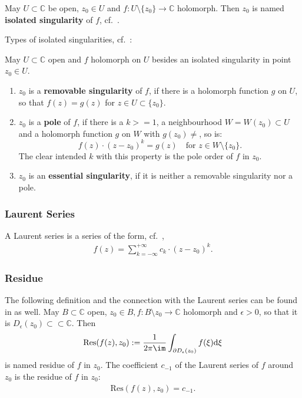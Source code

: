 May $U \subset \mathbb{C}$ be open, $z_0 \in U$ and $f : U \setminus \{z_0\} \rightarrow \mathbb{C}$ holomorph. Then $z_0$ is named \textbf{isolated singularity} of $f$, cf.~\cite{Fritzsche2019}.

Types of isolated singularities, cf.~\cite{Fritzsche2019}:

May $U \subset \mathbb{C}$ open and $f$ holomorph on $U$ besides an isolated singularity in point $z_0 \in U$.
\begin{enumerate}
	\item $z_0$ is a \textbf{removable singularity} of $f$, if there is a holomorph function $g$ on $U$, so that $f(z)=g(z)$ for $z \in U \subset \{z_0\}$.
	\item $z_0$ is a \textbf{pole} of $f$, if there is a $k >= 1$, a neighbourhood $W = W(z_0) \subset U$ and a holomorph function $g$ on $W$ with $g(z_0) \neq $, so is:
	\begin{equation}
		f(z)\cdot(z-z_0)^k=g(z)\quad \textrm{for }z \in W \setminus \{z_0\}. \nonumber
	\end{equation}
	The clear intended $k$ with this property is the pole order of $f$ in $z_0$.
	\item $z_0$ is an \textbf{essential singularity}, if it is neither a removable singularity nor a pole.
\end{enumerate}
\subsubsection{Laurent Series}
A Laurent series is a series of the form, cf.~\cite{Fritzsche2019},
\begin{align}
	f(z) = \sum_{k=-\infty}^{+\infty}c_k\cdot(z-z_0)^k.
\end{align}

\subsubsection{Residue}
The following definition and the connection with the Laurent series can be found in \cite{Fritzsche2019} as well.
May $B \subset \mathbb{C}$ open, $z_0 \in B, f: B \setminus z_0 \rightarrow \mathbb{C}$ holomorph and $\epsilon > 0$, so that it is $D_{\epsilon}(z_0)\subset\subset \mathbb{C}$. Then
\begin{align}
	\mathrm{Res}(f(z),z_0):=\frac{1}{2\pi\im}\int_{\partial D_{\epsilon}(z_0)}f(\xi)\mathrm{d}\xi
\end{align}
is named residue of $f$ in $z_0$.
The coefficient $c_{-1}$ of the Laurent series of $f$ around $z_0$ is the residue of $f$ in $z_0$:
\begin{align}
	\mathrm{Res}(f(z),z_0)=c_{-1}.
\end{align}
